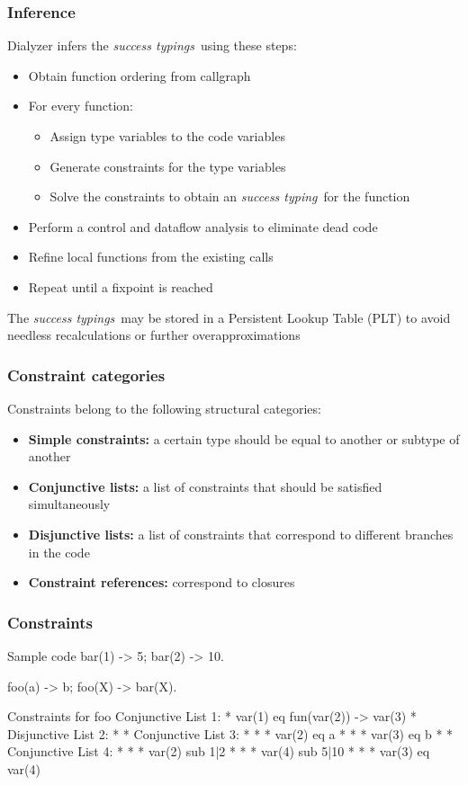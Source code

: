 \documentclass{beamer}
\newcommand{\st}{\emph{success typing}}
\newcommand{\sts}{\emph{success typings}}
\begin{document}
\begin{frame}
  \frametitle{Inference}
  Dialyzer infers the \sts\ using these steps:
  \begin{itemize}
  \item Obtain function ordering from callgraph \pause
  \item For every function:
    \begin{itemize}
    \item Assign type variables to the code variables \pause
    \item Generate constraints for the type variables \pause
    \item Solve the constraints to obtain an \st\ for the function \pause
    \end{itemize}
  \item Perform a control and dataflow analysis to eliminate dead code \pause
  \item Refine local functions from the existing calls \pause
  \item Repeat until a fixpoint is reached \pause
  \end{itemize}
  The \sts\ may be stored in a Persistent Lookup Table (PLT) to avoid
  needless recalculations or further overapproximations
\end{frame}

\begin{frame}
  \frametitle{Constraint categories}
  Constraints belong to the following structural categories: \pause
  \begin{itemize}
  \item \textbf{Simple constraints:} a certain type should be equal to
    another or subtype of another \pause
  \item \textbf{Conjunctive lists:} a list of constraints that should be
    satisfied simultaneously \pause
  \item \textbf{Disjunctive lists:} a list of constraints that
    correspond to different branches in the code \pause
  \item \textbf{Constraint references:} correspond to closures
  \end{itemize}
\end{frame}

\begin{frame}[fragile]
  \frametitle{Constraints}
\begin{code}{Sample code}
bar(1) -> 5;  %
bar(2) -> 10. %

foo(a) -> b;
foo(X) -> bar(X).
\end{code}
\begin{code}{Constraints for foo}
Conjunctive List 1:
 * var(1) eq fun(var(2)) -> var(3)
 * Disjunctive List 2:
 *  * Conjunctive List 3:
 *  *  * var(2) eq a
 *  *  * var(3) eq b
 *  * Conjunctive List 4:
 *  *  * var(2) sub 1|2
 *  *  * var(4) sub 5|10
 *  *  * var(3) eq var(4)
\end{code}
\end{frame}
\end{document}
